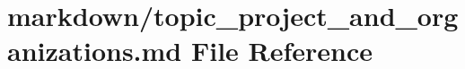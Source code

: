 \hypertarget{topic__project__and__organizations_8md}{}\section{markdown/topic\+\_\+project\+\_\+and\+\_\+organizations.md File Reference}
\label{topic__project__and__organizations_8md}
